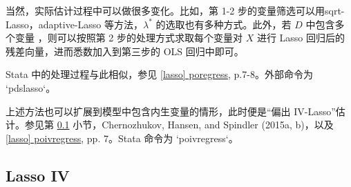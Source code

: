 { \def\FigName{Fig-lasso-poreg-01}
%	
%		
%		




当然，实际估计过程中可以做很多变化。比如，第 1-2 步的变量筛选可以用sqrt-Lasso，adaptive-Lasso 等方法，$\lambda^*$ 的选取也有多种方式。此外，若 $D$ 中包含多个变量%
，则可以按照第 2 步的处理方式求取每个变量对 $X$ 进行 Lasso 回归后的残差向量，进而悉数加入到第三步的 OLS 回归中即可。

Stata 中的处理过程与此相似，参见 \href{https://www.stata.com/manuals/lassoporegress.pdf}{[lasso] poregress}, p.7-8。外部命令为 `pdslasso`。

上述方法也可以扩展到模型中包含内生变量的情形，此时便是“偏出 IV-Lasso”估计。参见第 \ref{sec:lasso-IV} 小节，Chernozhukov, Hansen, and Spindler (2015a, b)，以及 \href{https://www.stata.com/manuals/lassopoivregress.pdf}{[lasso] poivregress}, pp. 7。Stata 命令为 `poivregress`。 









\subsection{Lasso IV}\label{sec:lasso-IV}

}
